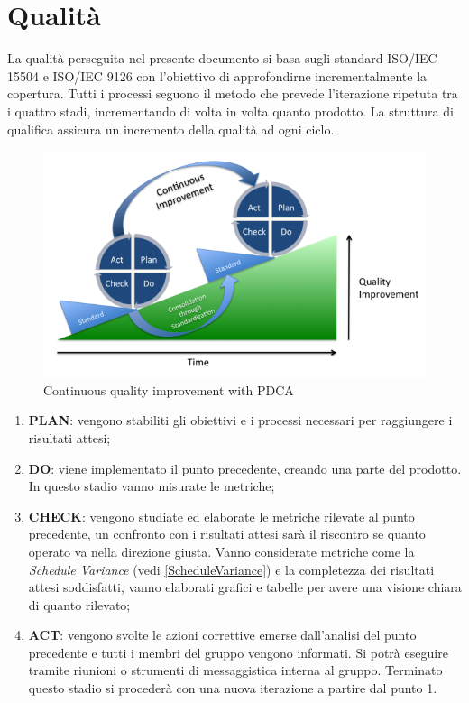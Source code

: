 \pagebreak
\section{Qualità}
La qualità perseguita nel presente documento si basa sugli standard ISO/IEC 15504  e ISO/IEC 9126 con l'obiettivo di approfondirne incrementalmente la copertura. Tutti i processi seguono il metodo  che prevede l'iterazione ripetuta tra i quattro stadi, incrementando di volta in volta quanto prodotto. La struttura di qualifica assicura un incremento della qualità ad ogni ciclo. \\
	\begin{figure}[h]
	\centering \includegraphics[width=1\textwidth]{PDCA.png}
	\caption{Continuous quality improvement with PDCA}
	\end{figure}
	
	\begin{enumerate}
		\item \textbf{PLAN}: vengono stabiliti gli obiettivi e i processi necessari per raggiungere i risultati attesi;
		\item \textbf{DO}: viene implementato il punto precedente, creando una parte del prodotto. In questo stadio vanno misurate le metriche;
		\item \textbf{CHECK}: vengono studiate ed elaborate le metriche rilevate al punto precedente, un confronto con i risultati attesi sarà il riscontro se quanto operato va nella direzione giusta. Vanno considerate metriche come la \emph{Schedule Variance} (vedi \ref{ScheduleVariance}) e la completezza dei risultati attesi soddisfatti, vanno elaborati grafici e tabelle per avere una visione chiara di quanto rilevato;
		\item \textbf{ACT}: vengono svolte le azioni correttive emerse dall'analisi del punto precedente e tutti i membri del gruppo vengono informati. Si potrà eseguire tramite riunioni o strumenti di messaggistica interna al gruppo. Terminato questo stadio si procederà con una nuova iterazione a partire dal punto 1.
	\end{enumerate}

